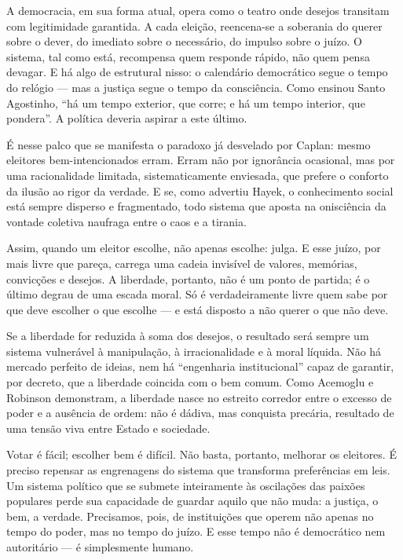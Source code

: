\begin{apendicesenv}
A democracia, em sua forma atual, opera como o teatro onde desejos transitam com legitimidade garantida. A cada eleição, reencena-se a soberania do querer sobre o dever, do imediato sobre o necessário, do impulso sobre o juízo. O sistema, tal como está, recompensa quem responde rápido, não quem pensa devagar. E há algo de estrutural nisso: o calendário democrático segue o tempo do relógio — mas a justiça segue o tempo da consciência. Como ensinou Santo Agostinho, “há um tempo exterior, que corre; e há um tempo interior, que pondera”. A política deveria aspirar a este último.

É nesse palco que se manifesta o paradoxo já desvelado por Caplan: mesmo eleitores bem-intencionados erram. Erram não por ignorância ocasional, mas por uma racionalidade limitada, sistematicamente enviesada, que prefere o conforto da ilusão ao rigor da verdade. E se, como advertiu Hayek, o conhecimento social está sempre disperso e fragmentado, todo sistema que aposta na onisciência da vontade coletiva naufraga entre o caos e a tirania.

Assim, quando um eleitor escolhe, não apenas escolhe: julga. E esse juízo, por mais livre que pareça, carrega uma cadeia invisível de valores, memórias, convicções e desejos. A liberdade, portanto, não é um ponto de partida; é o último degrau de uma escada moral. Só é verdadeiramente livre quem sabe por que deve escolher o que escolhe — e está disposto a não querer o que não deve.

Se a liberdade for reduzida à soma dos desejos, o resultado será sempre um sistema vulnerável à manipulação, à irracionalidade e à moral líquida. Não há mercado perfeito de ideias, nem há “engenharia institucional” capaz de garantir, por decreto, que a liberdade coincida com o bem comum. Como Acemoglu e Robinson demonstram, a liberdade nasce no estreito corredor entre o excesso de poder e a ausência de ordem: não é dádiva, mas conquista precária, resultado de uma tensão viva entre Estado e sociedade.

Votar é fácil; escolher bem é difícil. Não basta, portanto, melhorar os eleitores. É preciso repensar as engrenagens do sistema que transforma preferências em leis. Um sistema político que se submete inteiramente às oscilações das paixões populares perde sua capacidade de guardar aquilo que não muda: a justiça, o bem, a verdade. Precisamos, pois, de instituições que operem não apenas no tempo do poder, mas no tempo do juízo. E esse tempo não é democrático nem autoritário — é simplesmente humano.


\end{apendicesenv}
